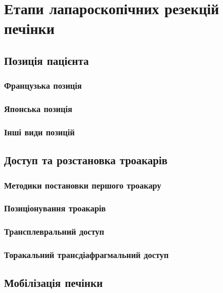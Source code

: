 \chapter{Етапи лапароскопічних резекцій печінки}
\begin{refsection}
\section{Позиція пацієнта}

\subsection{Французька позиція}

\subsection{Японська позиція}

\subsection{Інші види позицій}

\section{Доступ та розстановка троакарів}

\subsection{Методики постановки першого троакару}

\subsection{Позиціонування троакарів}

\subsection{Трансплевральний доступ}

\subsection{Торакальний трансдіафрагмальний доступ}

\section{Мобілізація печінки}


\end{refsection}
